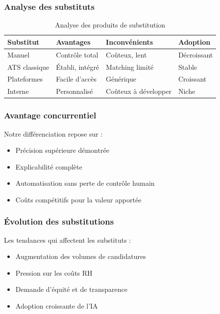 \documentclass[12pt,a4paper]{report}
\begin{document}
\subsubsection{Analyse des substituts}

\begin{table}[H]
\centering
\caption{Analyse des produits de substitution}
\label{tab:substituts}
\begin{tabular}{@{}llll@{}}
\toprule
Substitut & Avantages & Inconvénients & Adoption \\
\midrule
Manuel & Contrôle total & Coûteux, lent & Décroissant \\
ATS classique & Établi, intégré & Matching limité & Stable \\
Plateformes & Facile d'accès & Générique & Croissant \\
Interne & Personnalisé & Coûteux à développer & Niche \\
\bottomrule
\end{tabular}
\end{table}

\subsubsection{Avantage concurrentiel}

Notre différenciation repose sur :
\begin{itemize}
\item Précision supérieure démontrée
\item Explicabilité complète
\item Automatisation sans perte de contrôle humain
\item Coûts compétitifs pour la valeur apportée
\end{itemize}

\subsubsection{Évolution des substitutions}

Les tendances qui affectent les substituts :
\begin{itemize}
\item Augmentation des volumes de candidatures
\item Pression sur les coûts RH
\item Demande d'équité et de transparence
\item Adoption croissante de l'IA
\end{itemize}
\end{document}

